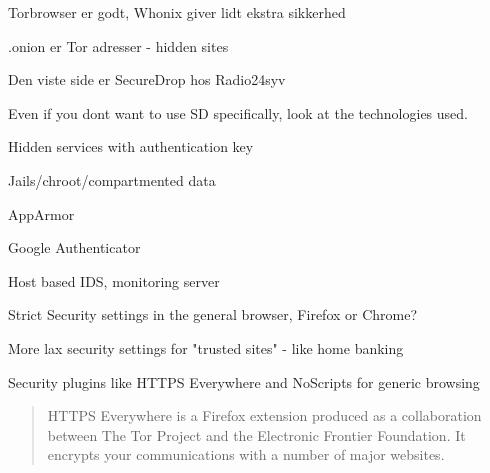 \documentclass[20pt,landscape,a4paper,footrule]{foils}
\begin{document}
\centerline{Torbrowser er godt, Whonix giver lidt ekstra sikkerhed}



\centerline{\color{titlecolor} .onion er Tor adresser - hidden sites}

{\footnotesize Den viste side er SecureDrop hos Radio24syv }



Even if you dont want to use SD specifically, look at the technologies used.
\begin{list2}
\item Hidden services with authentication key
\item Jails/chroot/compartmented data
\item AppArmor 
\item Google Authenticator
\item Host based IDS, monitoring server
\end{list2}






\begin{list2}
\item Strict Security settings in the general browser, Firefox or Chrome?
\item More lax security settings for "trusted sites" - like home banking
\item Security plugins like HTTPS Everywhere and NoScripts for generic browsing
\end{list2}


\begin{quote}
HTTPS Everywhere is a Firefox extension produced as a collaboration between The Tor Project and the Electronic Frontier Foundation. It encrypts your communications with a number of major websites.
\end{quote}

\centerline{}


\end{document}
